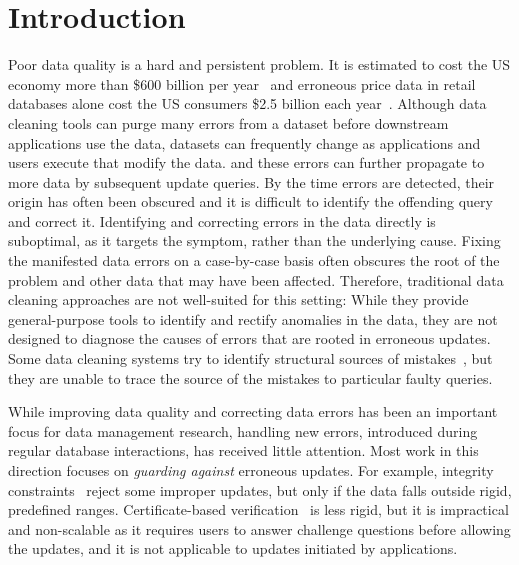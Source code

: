 
\section{Introduction}
\label{s:intro}

Poor data quality is a hard and persistent problem.  
It is estimated to cost the US economy more than \$600 billion
per year~\cite{eckerson2002} and erroneous price data in retail databases
alone cost the US consumers \$2.5 billion each year~\cite{Fan2008}. 
Although data
cleaning tools can purge many errors from a dataset before downstream 
applications use the data, datasets can frequently change as applications
and users execute  that modify the data. 
and these
errors can further propagate to more data by subsequent update queries.
By the time errors are detected, their origin has often been obscured and it is difficult to identify the offending query and correct it.
Identifying and correcting errors in the data directly is suboptimal, as it targets the symptom,
rather than the underlying cause. Fixing the manifested data errors on a
case-by-case basis often obscures the root of the problem and other data that may have been
affected. Therefore, traditional data cleaning approaches are not well-suited
for this setting: While they provide general-purpose tools to identify and
rectify anomalies in the data, they are not designed to diagnose the causes of
errors that are rooted in erroneous updates.
Some data cleaning systems try to identify structural sources of
mistakes~\cite{wang2015}, but they are unable to trace the source of
the mistakes to particular faulty queries.

While improving data quality and correcting data errors has been an important
focus for data management research, handling new errors, introduced during
regular database interactions, has received little attention. Most work in
this direction focuses on \emph{guarding against} erroneous updates. For
example, integrity constraints~\cite{Khoussainova2006} reject some improper
updates, 
but only if the data falls outside rigid, predefined ranges.
Certificate-based verification~\cite{Chen2011} is less rigid, but it is
impractical and non-scalable as it requires users to answer challenge
questions before allowing the updates, and it is not applicable to updates
initiated by applications.


